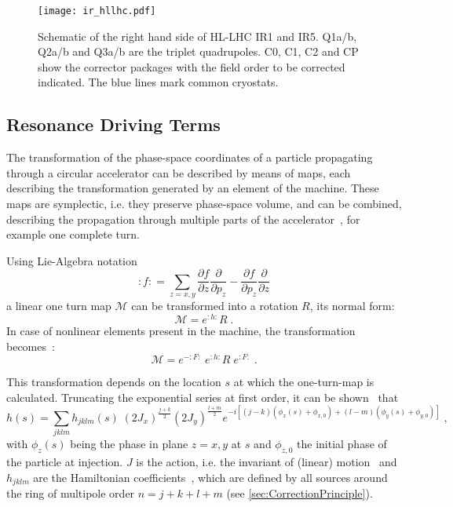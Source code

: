 \begin{figure}[h!]
    \centering
    \texttt{[image: ir\_hllhc.pdf]}
    \caption{Schematic of the right hand side of HL-LHC IR1 and IR5.
    Q1a/b, Q2a/b and Q3a/b are the triplet quadrupoles. 
    C0, C1, C2 and CP show the corrector packages with the field order to be corrected indicated. 
    The blue lines mark common cryostats. 
    }
    \label{fig:irregionhllhc}
\end{figure}


\subsection{Resonance Driving Terms}

The transformation of the phase-space coordinates of a particle propagating through a circular accelerator 
can be described by means of maps, each describing the transformation generated by an element of the machine.
These maps are symplectic, i.e. they preserve phase-space volume, and can be combined, describing the propagation 
through multiple parts of the accelerator~\cite{DragtLieSeriesInvariant1976}, for example one complete turn. 

Using Lie-Algebra notation~\cite{DragtLieSeriesInvariant1976, DragtLieAlgebraicTheory1982}
%
\begin{equation}
    \label{eq:LieOperator}
    :f: = \sum\limits_{z=x,y} \frac{\partial f}{\partial z} \frac{\partial }{\partial p_z} - \frac{\partial f}{\partial p_z} \frac{\partial }{\partial z}
\end{equation}
%
a linear one turn map $\mathcal{M}$ can be transformed into a rotation $R$, its normal form:
\begin{equation}
    \label{eq:NormalizedTransformation}
    \mathcal{M} = e^{:h:}R  \; .
\end{equation}
%
In case of nonlinear elements present in the machine, the transformation becomes~\cite{ForestHamiltonianFreeDescription1990}:
\begin{equation}
    \label{eq:NormalFormTransformation}
    \mathcal{M} = e^{-:F:} \;  e^{:h:}R \; e^{:F:} \; .
\end{equation}

This transformation depends on the location $s$ at which the one-turn-map is calculated.
Truncating the exponential series at first order, it can be shown~\cite{TomasDirectMeasurementResonance2003} that
%
\begin{equation}
    \label{eq:hamiltonianTwissCoordinates}
    h(s) = \sum\limits_{jklm} h_{jklm}(s) \; (2J_x)^{\frac{j+k}{2}}(2J_y)^{\frac{l+m}{2}} e^{-i\left[(j-k)(\phi_x(s) + \phi_{x,0}) + (l-m)(\phi_y(s) + \phi_{y,0})\right]} \; ,
\end{equation}
%
with $\phi_{z}(s)$ being the phase in plane $z=x,y$ at $s$ and $\phi_{z, 0}$ the initial phase of the particle at injection.
$J$ is the action, i.e. the invariant of (linear) motion~\cite{CourantTheoryAlternatinggradientSynchrotron1958} and $h_{jklm}$ are the 
Hamiltonian coefficients~\cite{TomasDirectMeasurementResonance2003}, which 
are defined by all sources around the ring of multipole order $n = j + k + l + m$ (see \cref{sec:CorrectionPrinciple}).

